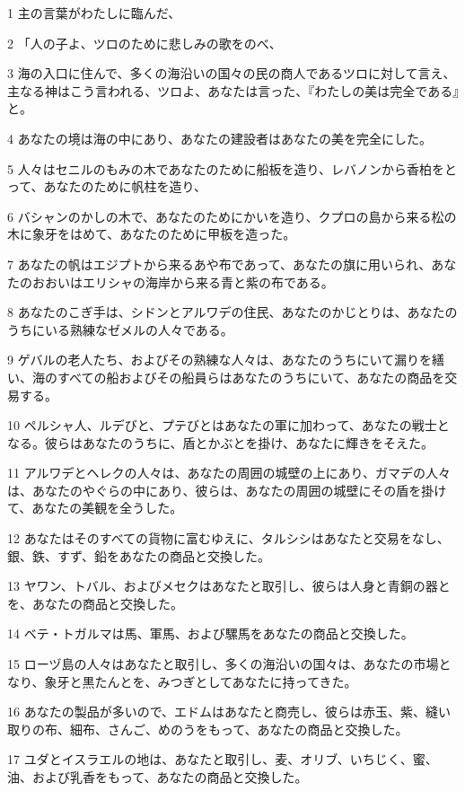 \par 1 主の言葉がわたしに臨んだ、
\par 2 「人の子よ、ツロのために悲しみの歌をのべ、
\par 3 海の入口に住んで、多くの海沿いの国々の民の商人であるツロに対して言え、主なる神はこう言われる、ツロよ、あなたは言った、『わたしの美は完全である』と。
\par 4 あなたの境は海の中にあり、あなたの建設者はあなたの美を完全にした。
\par 5 人々はセニルのもみの木であなたのために船板を造り、レバノンから香柏をとって、あなたのために帆柱を造り、
\par 6 バシャンのかしの木で、あなたのためにかいを造り、クプロの島から来る松の木に象牙をはめて、あなたのために甲板を造った。
\par 7 あなたの帆はエジプトから来るあや布であって、あなたの旗に用いられ、あなたのおおいはエリシャの海岸から来る青と紫の布である。
\par 8 あなたのこぎ手は、シドンとアルワデの住民、あなたのかじとりは、あなたのうちにいる熟練なゼメルの人々である。
\par 9 ゲバルの老人たち、およびその熟練な人々は、あなたのうちにいて漏りを繕い、海のすべての船およびその船員らはあなたのうちにいて、あなたの商品を交易する。
\par 10 ペルシャ人、ルデびと、プテびとはあなたの軍に加わって、あなたの戦士となる。彼らはあなたのうちに、盾とかぶとを掛け、あなたに輝きをそえた。
\par 11 アルワデとヘレクの人々は、あなたの周囲の城壁の上にあり、ガマデの人々は、あなたのやぐらの中にあり、彼らは、あなたの周囲の城壁にその盾を掛けて、あなたの美観を全うした。
\par 12 あなたはそのすべての貨物に富むゆえに、タルシシはあなたと交易をなし、銀、鉄、すず、鉛をあなたの商品と交換した。
\par 13 ヤワン、トバル、およびメセクはあなたと取引し、彼らは人身と青銅の器とを、あなたの商品と交換した。
\par 14 ベテ・トガルマは馬、軍馬、および騾馬をあなたの商品と交換した。
\par 15 ローヅ島の人々はあなたと取引し、多くの海沿いの国々は、あなたの市場となり、象牙と黒たんとを、みつぎとしてあなたに持ってきた。
\par 16 あなたの製品が多いので、エドムはあなたと商売し、彼らは赤玉、紫、縫い取りの布、細布、さんご、めのうをもって、あなたの商品と交換した。
\par 17 ユダとイスラエルの地は、あなたと取引し、麦、オリブ、いちじく、蜜、油、および乳香をもって、あなたの商品と交換した。
